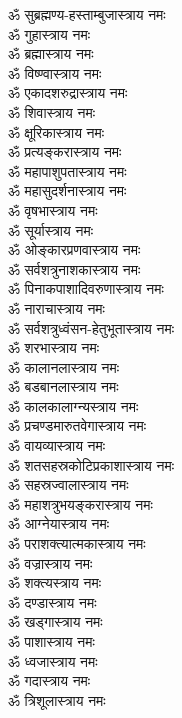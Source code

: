 \begin{flushleft}
\begin{multicols}{2}
ॐ सुब्रह्मण्य-हस्ताम्बुजास्त्राय नमः\\
ॐ गुहास्त्राय नमः\\
ॐ ब्रह्मास्त्राय नमः\\
ॐ विष्ण्वास्त्राय नमः\\
ॐ एकादशरुद्रास्त्राय नमः\\
ॐ शिवास्त्राय नमः\\
ॐ क्षूरिकास्त्राय नमः\\
ॐ प्रत्यङ्करास्त्राय नमः\\
ॐ महापाशुपतास्त्राय नमः\\
ॐ महासुदर्शनास्त्राय नमः\hfill{}\\
ॐ वृषभास्त्राय नमः\\
ॐ सूर्यास्त्राय नमः\\
ॐ ओङ्कारप्रणवास्त्राय नमः\\
ॐ सर्वशत्रुनाशकास्त्राय नमः\\
ॐ पिनाकपाशादिवरुणास्त्राय नमः\\
ॐ नाराचास्त्राय नमः\\
ॐ सर्वशत्रुध्वंसन-हेतुभूतास्त्राय नमः\\
ॐ शरभास्त्राय नमः\\
ॐ कालानलास्त्राय नमः\\
ॐ बडबानलास्त्राय नमः \hfill{}\\
ॐ कालकालाग्न्यस्त्राय नमः\\
ॐ प्रचण्डमारुतवेगास्त्राय नमः\\
ॐ वायव्यास्त्राय नमः\\
ॐ शतसहस्रकोटिप्रकाशास्त्राय नमः\\
ॐ सहस्रज्वालास्त्राय नमः\\
ॐ महाशत्रुभयङ्करास्त्राय नमः\\
ॐ आग्नेयास्त्राय नमः\\
ॐ पराशक्त्यात्मकास्त्राय नमः\\
ॐ वज्रास्त्राय नमः\\
ॐ शक्त्यस्त्राय नमः\hfill{}\\
ॐ दण्डास्त्राय नमः\\
ॐ खड्गास्त्राय नमः\\
ॐ पाशास्त्राय नमः\\
ॐ ध्वजास्त्राय नमः\\
ॐ गदास्त्राय नमः\\
ॐ त्रिशूलास्त्राय नमः\\

\end{multicols}
\end{flushleft}
